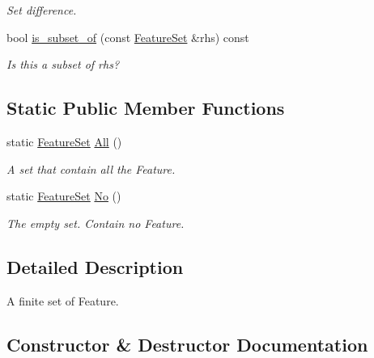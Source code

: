 \begin{DoxyCompactItemize}
\begin{DoxyCompactList}\small\item\em Set difference. \end{DoxyCompactList}\item 
bool \hyperlink{classtvm_1_1relay_1_1FeatureSet_a1024f586b1b0ea8d78274f8066876af3}{is\+\_\+subset\+\_\+of} (const \hyperlink{classtvm_1_1relay_1_1FeatureSet}{Feature\+Set} \&rhs) const 
\begin{DoxyCompactList}\small\item\em Is this a subset of rhs? \end{DoxyCompactList}\end{DoxyCompactItemize}
\subsection*{Static Public Member Functions}
\begin{DoxyCompactItemize}
\item 
static \hyperlink{classtvm_1_1relay_1_1FeatureSet}{Feature\+Set} \hyperlink{classtvm_1_1relay_1_1FeatureSet_abbedfbde4f544c66e6129181b3c29c2a}{All} ()
\begin{DoxyCompactList}\small\item\em A set that contain all the Feature. \end{DoxyCompactList}\item 
static \hyperlink{classtvm_1_1relay_1_1FeatureSet}{Feature\+Set} \hyperlink{classtvm_1_1relay_1_1FeatureSet_a68c408c752ef58b2c27802491165adbb}{No} ()
\begin{DoxyCompactList}\small\item\em The empty set. Contain no Feature. \end{DoxyCompactList}\end{DoxyCompactItemize}


\subsection{Detailed Description}
A finite set of Feature. 

\subsection{Constructor \& Destructor Documentation}
